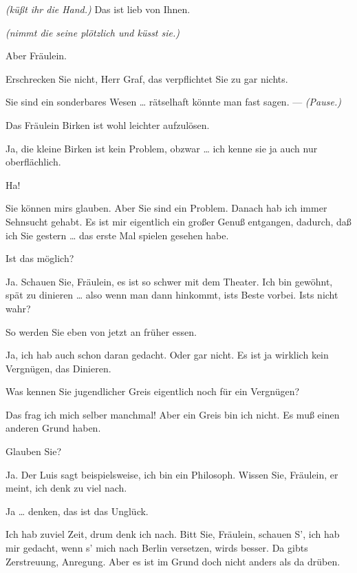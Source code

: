 \documentclass[
	final,
	a4paper,
	ngerman,
	mpinclude = true, %
	twoside = true,
	open = right,
	cleardoublepage = plain,
	DIV = 13,
	BCOR = 1cm,
	titlepage = firstiscover,
	]{scrbook}
\newcommand{\direction}[1]{\textit{(#1)}}
\newcommand{\thecharacter}[1]{\textup{\textsc{#1}}\xspace}
\newcommand{\theschauspielerin}{\thecharacter{Daniela}}
\newcommand{\theentrepeneurin}{\thecharacter{Katerina Albrecht}}
\newcommand{\character}[1]{\item[#1:]}
\newcommand{\schauspielerin}{\character{\theschauspielerin}}
\newcommand{\entrepeneurin}{\character{\theentrepeneurin}}
\begin{document}
\begin{play}
	\entrepeneurin
	\direction{küßt ihr die Hand.} Das ist lieb von Ihnen.

	\schauspielerin
	\direction{nimmt die seine plötzlich und küsst sie.}

	\entrepeneurin
	Aber Fräulein.

	\schauspielerin
	Erschrecken Sie nicht, Herr Graf, das verpflichtet Sie zu gar nichts.

	\entrepeneurin
	Sie sind ein sonderbares Wesen \ldots{} rätselhaft könnte man fast sagen. --- \direction{Pause.}

	\schauspielerin
	Das Fräulein Birken ist wohl leichter aufzulösen.

	\entrepeneurin
	Ja, die kleine Birken ist kein Problem, obzwar \ldots{} ich kenne sie ja auch nur oberflächlich.

	\schauspielerin
	Ha!

	\entrepeneurin
	Sie können mirs glauben. Aber Sie sind ein Problem. Danach hab ich immer Sehnsucht gehabt. Es ist mir eigentlich ein großer Genuß entgangen, dadurch, daß ich Sie gestern \ldots{} das erste Mal spielen gesehen habe.

	\schauspielerin
	Ist das möglich?

	\entrepeneurin
	Ja. Schauen Sie, Fräulein, es ist so schwer mit dem Theater. Ich bin gewöhnt, spät zu dinieren \ldots{} also wenn man dann hinkommt, ists Beste vorbei. Ists nicht wahr?

	\schauspielerin
	So werden Sie eben von jetzt an früher essen.

	\entrepeneurin
	Ja, ich hab auch schon daran gedacht. Oder gar nicht. Es ist ja wirklich kein Vergnügen, das Dinieren.

	\schauspielerin
	Was kennen Sie jugendlicher Greis eigentlich noch für ein Vergnügen?

	\entrepeneurin
	Das frag ich mich selber manchmal! Aber ein Greis bin ich nicht. Es muß einen anderen Grund haben.

	\schauspielerin
	Glauben Sie?

	\entrepeneurin
	Ja. Der Luis sagt beispielsweise, ich bin ein Philosoph. Wissen Sie, Fräulein, er meint, ich denk zu viel nach.

	\schauspielerin
	Ja \ldots{} denken, das ist das Unglück.

	\entrepeneurin
	Ich hab zuviel Zeit, drum denk ich nach. Bitt Sie, Fräulein, schauen S', ich hab mir gedacht, wenn s' mich nach Berlin versetzen, wirds besser. Da gibts Zerstreuung, Anregung. Aber es ist im Grund doch nicht anders als da drüben.


\end{play}
\end{document}
